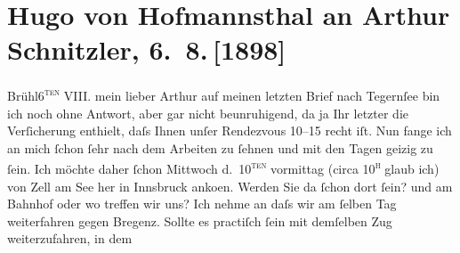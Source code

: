 

               \section[Hugo von Hofmannsthal an Arthur Schnitzler, 6. 8. {[}1898{]}]{ Hugo von Hofmannsthal an Arthur Schnitzler, 6. 8. {[}1898{]}}\nopagebreak{}\rehead{ }\begin{ledgroupsized}[t]{13cm}\normalsize\beginnumbering{} \toendnotes[C]{\smallbreak\pagebreak[2]} 
\toendnotes[C]{\smallbreak}\pstart
           \raggedleft{}{\pb}Brühl6\textsc{\textsuperscript{ten}} VIII.\pend
           \pstart{}mein lieber Arthur\pend\pstart
           auf meinen letzten Brief \introOben{}nach Tegernſee\introOben{} bin ich noch ohne Antwort, aber gar nicht beunruhigend, da ja Ihr letzter
                    die Verſicherung enthielt, daſs Ihnen unſer Rendezvous
                        10–15 recht iſt. Nun fange ich an mich ſchon ſehr
                    nach dem Arbeiten zu ſehnen und mit den Tagen geizig zu ſein.\pend
           \pstart
           {\pb}Ich möchte daher ſchon
                        Mittwoch d. 10\textsc{\textsuperscript{ten}} vormittag (circa 10\textsc{\textsuperscript{h}} glaub ich) von Zell am See her in Innsbruck anko{\geminationm}en.
                    Werden Sie da ſchon dort ſein? und am Bahnhof oder wo treffen wir uns? Ich nehme an daſs
                    wir am ſelben Tag weiterfahren gegen Bregenz.
                    Sollte es practiſch ſein mit demſelben {\pb}Zug weiterzufahren, in dem

\end{ledgroupsized}
